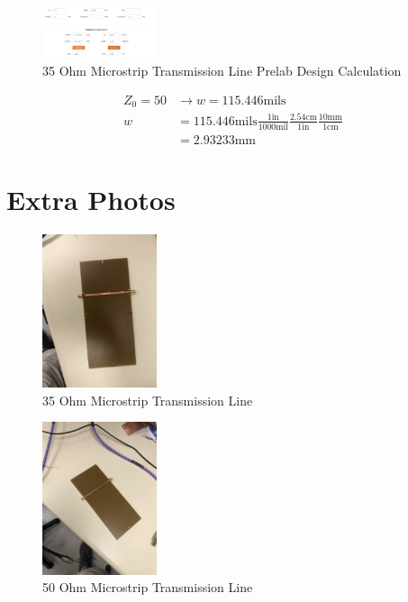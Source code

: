 \documentclass[journal]{IEEEtran}
\begin{document}
\begin{figure}[hp]
    \centering
    \includegraphics[width=0.3\textwidth]{design_50.png}
    \caption{35 Ohm Microstrip Transmission Line Prelab Design Calculation}
\end{figure}

\begin{align*}
    Z_{0} =50 & \rightarrow w=115.446\text{mils}                                                                                   \\
    w         & =115.446\text{mils}\frac{1\text{in}}{1000\text{mil}}\frac{2.54\text{cm}}{1\text{in}}\frac{10\text{mm}}{1\text{cm}} \\
              & =2.93233\text{mm}
\end{align*}


\section{Extra Photos}
\begin{figure}
    \centering
    \includegraphics[width=0.3\textwidth]{microstrip_35.jpg}
    \caption{35 Ohm Microstrip Transmission Line}
\end{figure}

\begin{figure}
    \centering
    \includegraphics[width=0.3\textwidth]{microstrip_50.jpg}
    \caption{50 Ohm Microstrip Transmission Line}
\end{figure}
\end{document}
